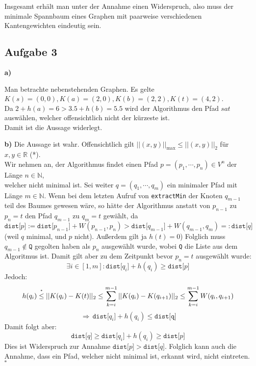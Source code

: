 \documentclass[a4paper,graphics,11pt]{article}
\newcommand{\aufgabe}[1]{\subsection*{Aufgabe #1}}
\newcommand{\up}[2]{\mathrel{\overset{\makebox[0pt]{\mbox{\normalfont\tiny #2}}}{#1}}}
\begin{document}
Insgesamt erhält man unter der Annahme einen Widerspruch, also muss der minimale Spannbaum eines Graphen mit paarweise verschiedenen
Kantengewichten eindeutig sein.


\aufgabe{3}
\textbf{a)}

\begin{minipage}{0.35\textwidth}
\end{minipage}
\begin{minipage}{0.7\textwidth}
    Man betrachte nebenstehenden Graphen. Es gelte\\
    $K(s) = (0,0), K(a) = (2,0), K(b) = (2,2), K(t) = (4,2)$.\\
    Da $2 + h(a) = 6 > 3.5 + h(b) = 5.5$ wird der Algorithmus den Pfad $sat$ auswählen,
    welcher offensichtlich nicht der kürzeste ist.\\
    Damit ist die Aussage widerlegt.
\end{minipage}

\textbf{b)}
Die Aussage ist wahr. Offensichtlich gilt $||(x,y)||_\text{max} \leq ||(x,y)||_2$ für $x,y \in \mathbb{R}$ (*).\\
Wir nehmen an, der Algorithmus findet einen Pfad $p = (p_1, \cdots, p_n) \in V^n$ der Länge $n \in \mathbb{N}$,\\
welcher nicht minimal ist. Sei weiter $q = (q_1, \cdots, q_m)$ ein minimaler Pfad mit Länge $m \in \mathbb{N}$.
Wenn bei dem letzten Aufruf von \texttt{extractMin} der Knoten $q_{m-1}$ teil des Baumes gewesen wäre,
so hätte der Algorithmus anstatt von $p_{n-1}$ zu $p_n = t$ den Pfad $q_{m-1}$ zu $q_m = t$ gewählt,
da
$$
    \texttt{dist[$p$]}
    := \texttt{dist[$p_{n-1}$]} + W(p_{n-1}, p_n)
    > \texttt{dist[$q_{m-1}$]} + W(q_{m-1}, q_m)
    =: \texttt{dist[$q$]}
$$
(weil $q$ minimal, und $p$ nicht). Außerdem gilt ja $h(t) = 0$)
Folglich muss $q_{m-1} \notin \texttt{Q}$ gegolten haben als $p_n$ ausgewählt wurde, wobei \texttt{Q} die Liste aus dem Algoritmus ist.
Damit gilt aber zu dem Zeitpunkt bevor $p_n = t$ ausgewählt wurde:
$$
    \exists i \in [1,m] : \texttt{dist[$q_i$]}+h(q_i) \geq \texttt{dist[$p$]}
$$
Jedoch:
$$
    h(q_i)
    \up{\leq}{*} ||K(q_i) - K(t)||_2
    \leq \sum_{k=i}^{m-1} ||K(q_i) - K(q_{i+1})||_2
    \leq \sum_{k=i}^{m-1} W(q_i, q_{i+1})
$$$$
    \,\Longrightarrow\, \texttt{dist[$q_i$]}+h(q_i) \leq \texttt{dist[q]}
$$
Damit folgt aber:
$$
    \texttt{dist[$q$]}
    \geq\texttt{dist[$q_i$]}+h(q_i)
    \geq \texttt{dist[$p$]}
$$
Dies ist Widerspruch zur Annahme $\texttt{dist[$p$]} > \texttt{dist[$q$]}$. Folglich kann auch die Annahme, dass
ein Pfad, welcher nicht minimal ist, erkannt wird, nicht eintreten.\hfill$\square$
\end{document}
